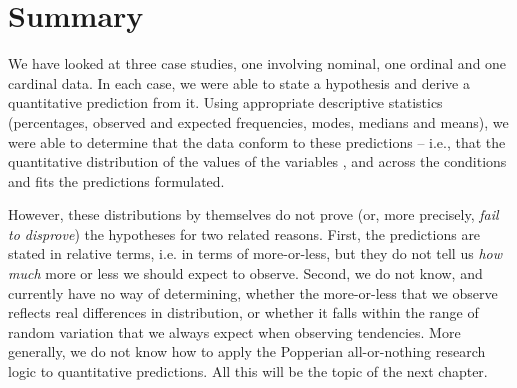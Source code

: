 \section{Summary}
\label{sec:datatypessummary}

We have looked at three case studies, one involving nominal, one ordinal and one cardinal data. In each case, we were able to state a hypothesis and derive a quantitative prediction from it. Using appropriate descriptive statistics (percentages, observed and expected frequencies, modes, medians and means), we were able to determine that the data conform to these predictions -- i.e., that the quantitative distribution of the values of the variables ,  and  across the conditions  and  fits the predictions formulated.

However, these distributions by themselves do not prove (or, more precisely, \textit{fail to disprove}) the hypotheses for two related reasons. First, the predictions are stated in relative terms, i.e. in terms of more-or-less, but they do not tell us \textit{how much} more or less we should expect to observe. Second, we do not know, and currently have no way of determining, whether the more-or-less that we observe reflects real differences in distribution, or whether it falls within the range of random variation that we always expect when observing tendencies. More generally, we do not know how to apply the Popperian all-or-nothing research logic to quantitative predictions. All this will be the topic of the next chapter.
